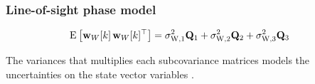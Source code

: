 \documentclass[
    hyperref={colorlinks,citecolor=DeepPink4,linkcolor=DarkRed,urlcolor=DarkBlue}
]{beamer_class}
\begin{document}
\begin{frame}
    \frametitle{Line-of-sight phase model}

    \begin{align}
        \E{\mathbf{w}_{W}[k]\,\mathbf{w}_{W}[k]^{\top}}
        &= \sigma_{\mathrm{W},1}^{2} \mathbf{Q}_{1} + \sigma_{\mathrm{W},2}^{2} \mathbf{Q}_{2} + \sigma_{\mathrm{W},3}^{2} \mathbf{Q}_{3} 
    \end{align}

    The variances that multiplies each subcovariance matrices models the uncertainties on the state vector variables \cite{fohlmeisterGNSSCarrierPhase2021}.

\end{frame}
\end{document}
